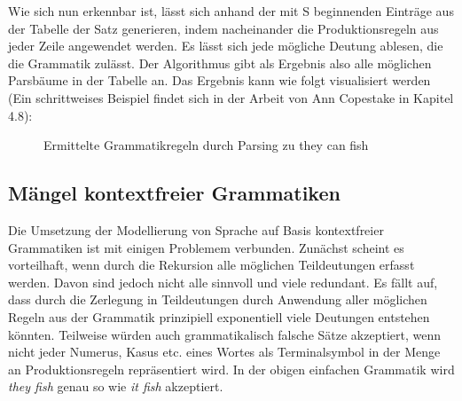 \documentclass[12pt]{report}
\begin{document}
Wie sich nun erkennbar ist, lässt sich anhand der mit S beginnenden Einträge aus der Tabelle der Satz generieren, indem nacheinander die Produktionsregeln aus jeder Zeile angewendet werden. Es lässt sich jede mögliche Deutung ablesen, die die Grammatik zulässt. Der Algorithmus gibt als Ergebnis also alle möglichen Parsbäume in der Tabelle an. Das Ergebnis kann wie folgt visualisiert werden (Ein schrittweises Beispiel findet sich in der Arbeit von Ann Copestake \cite{cop04} in Kapitel 4.8):
\begin{figure}
\begin{center}
\caption{Ermittelte Grammatikregeln durch Parsing zu \glqq  they can fish\grqq{}}
\end{center}
\end{figure}

\subsection{Mängel kontextfreier Grammatiken}
Die Umsetzung der Modellierung von Sprache auf Basis kontextfreier Grammatiken ist mit einigen Problemem verbunden. Zunächst scheint es vorteilhaft, wenn durch die Rekursion alle möglichen Teildeutungen erfasst werden. Davon sind jedoch nicht alle sinnvoll und viele redundant. Es fällt auf, dass durch die Zerlegung in Teildeutungen durch Anwendung aller möglichen Regeln aus der Grammatik prinzipiell exponentiell viele Deutungen entstehen könnten. Teilweise würden auch grammatikalisch falsche Sätze akzeptiert, wenn nicht jeder Numerus, Kasus etc. eines Wortes als Terminalsymbol in der Menge an Produktionsregeln repräsentiert wird. In der obigen einfachen Grammatik wird \textit{\glqq  they fish\grqq{}} genau so wie \textit{\glqq  it fish\grqq{}} akzeptiert. 
\end{document}
